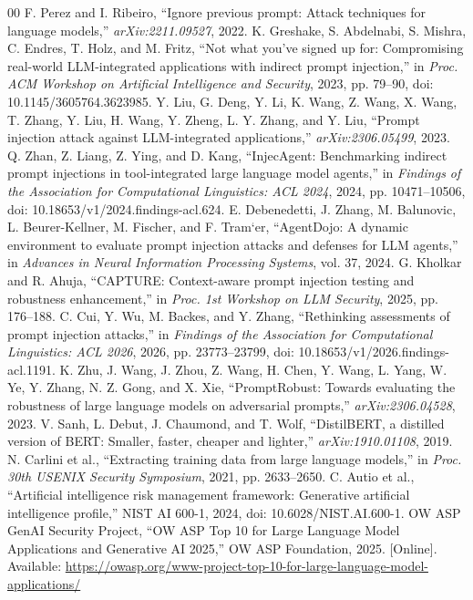 \documentclass[conference]{IEEEtran}
\begin{document}
\begin{thebibliography}{00}
 F. Perez and I. Ribeiro, ``Ignore previous prompt: Attack techniques for language models,'' \emph{arXiv:2211.09527}, 2022.
 K. Greshake, S. Abdelnabi, S. Mishra, C. Endres, T. Holz, and M. Fritz, ``Not what you've signed up for: Compromising real-world LLM-integrated applications with indirect prompt injection,'' in \emph{Proc. ACM Workshop on Artificial Intelligence and Security}, 2023, pp. 79--90, doi: 10.1145/3605764.3623985.
 Y. Liu, G. Deng, Y. Li, K. Wang, Z. Wang, X. Wang, T. Zhang, Y. Liu, H. Wang, Y. Zheng, L. Y. Zhang, and Y. Liu, ``Prompt injection attack against LLM-integrated applications,'' \emph{arXiv:2306.05499}, 2023.
 Q. Zhan, Z. Liang, Z. Ying, and D. Kang, ``InjecAgent: Benchmarking indirect prompt injections in tool-integrated large language model agents,'' in \emph{Findings of the Association for Computational Linguistics: ACL 2024}, 2024, pp. 10471--10506, doi: 10.18653/v1/2024.findings-acl.624.
 E. Debenedetti, J. Zhang, M. Balunovic, L. Beurer-Kellner, M. Fischer, and F. Tram`er, ``AgentDojo: A dynamic environment to evaluate prompt injection attacks and defenses for LLM agents,'' in \emph{Advances in Neural Information Processing Systems}, vol. 37, 2024.
 G. Kholkar and R. Ahuja, ``CAPTURE: Context-aware prompt injection testing and robustness enhancement,'' in \emph{Proc. 1st Workshop on LLM Security}, 2025, pp. 176--188.
 C. Cui, Y. Wu, M. Backes, and Y. Zhang, ``Rethinking assessments of prompt injection attacks,'' in \emph{Findings of the Association for Computational Linguistics: ACL 2026}, 2026, pp. 23773--23799, doi: 10.18653/v1/2026.findings-acl.1191.
 K. Zhu, J. Wang, J. Zhou, Z. Wang, H. Chen, Y. Wang, L. Yang, W. Ye, Y. Zhang, N. Z. Gong, and X. Xie, ``PromptRobust: Towards evaluating the robustness of large language models on adversarial prompts,'' \emph{arXiv:2306.04528}, 2023.
 V. Sanh, L. Debut, J. Chaumond, and T. Wolf, ``DistilBERT, a distilled version of BERT: Smaller, faster, cheaper and lighter,'' \emph{arXiv:1910.01108}, 2019.
 N. Carlini et al., ``Extracting training data from large language models,'' in \emph{Proc. 30th USENIX Security Symposium}, 2021, pp. 2633--2650.
 C. Autio et al., ``Artificial intelligence risk management framework: Generative artificial intelligence profile,'' NIST AI 600-1, 2024, doi: 10.6028/NIST.AI.600-1.
 OW ASP GenAI Security Project, ``OW ASP Top 10 for Large Language Model Applications and Generative AI 2025,'' OW ASP Foundation, 2025. [Online]. Available: \url{https://owasp.org/www-project-top-10-for-large-language-model-applications/}
\end{thebibliography}
\end{document}
